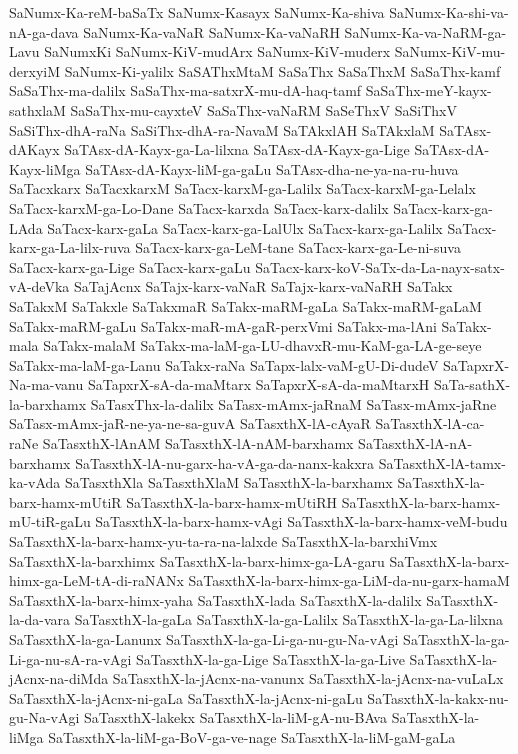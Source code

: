 {SaNumx-Ka-reM-baSaTx
SaNumx-Kasayx
SaNumx-Ka-shiva
SaNumx-Ka-shi-va-nA-ga-dava
SaNumx-Ka-vaNaR
SaNumx-Ka-vaNaRH
SaNumx-Ka-va-NaRM-ga-Lavu
SaNumxKi
SaNumx-KiV-mudArx
SaNumx-KiV-muderx
SaNumx-KiV-mu-derxyiM
SaNumx-Ki-yalilx
SaSAThxMtaM
SaSaThx
SaSaThxM
SaSaThx-kamf
SaSaThx-ma-dalilx
SaSaThx-ma-satxrX-mu-dA-haq-tamf
SaSaThx-meY-kayx-sathxlaM
SaSaThx-mu-cayxteV
SaSaThx-vaNaRM
SaSeThxV
SaSiThxV
SaSiThx-dhA-raNa
SaSiThx-dhA-ra-NavaM
SaTAkxlAH
SaTAkxlaM
SaTAsx-dAKayx
SaTAsx-dA-Kayx-ga-La-lilxna
SaTAsx-dA-Kayx-ga-Lige
SaTAsx-dA-Kayx-liMga
SaTAsx-dA-Kayx-liM-ga-gaLu
SaTAsx-dha-ne-ya-na-ru-huva
SaTacxkarx
SaTacxkarxM
SaTacx-karxM-ga-Lalilx
SaTacx-karxM-ga-Lelalx
SaTacx-karxM-ga-Lo-Dane
SaTacx-karxda
SaTacx-karx-dalilx
SaTacx-karx-ga-LAda
SaTacx-karx-gaLa
SaTacx-karx-ga-LalUlx
SaTacx-karx-ga-Lalilx
SaTacx-karx-ga-La-lilx-ruva
SaTacx-karx-ga-LeM-tane
SaTacx-karx-ga-Le-ni-suva
SaTacx-karx-ga-Lige
SaTacx-karx-gaLu
SaTacx-karx-koV-SaTx-da-La-nayx-satx-vA-deVka
SaTajAcnx
SaTajx-karx-vaNaR
SaTajx-karx-vaNaRH
SaTakx
SaTakxM
SaTakxle
SaTakxmaR
SaTakx-maRM-gaLa
SaTakx-maRM-gaLaM
SaTakx-maRM-gaLu
SaTakx-maR-mA-gaR-perxVmi
SaTakx-ma-lAni
SaTakx-mala
SaTakx-malaM
SaTakx-ma-laM-ga-LU-dhavxR-mu-KaM-ga-LA-ge-seye
SaTakx-ma-laM-ga-Lanu
SaTakx-raNa
SaTapx-lalx-vaM-gU-Di-dudeV
SaTapxrX-Na-ma-vanu
SaTapxrX-sA-da-maMtarx
SaTapxrX-sA-da-maMtarxH
SaTa-sathX-la-barxhamx
SaTasxThx-la-dalilx
SaTasx-mAmx-jaRnaM
SaTasx-mAmx-jaRne
SaTasx-mAmx-jaR-ne-ya-ne-sa-guvA
SaTasxthX-lA-cAyaR
SaTasxthX-lA-ca-raNe
SaTasxthX-lAnAM
SaTasxthX-lA-nAM-barxhamx
SaTasxthX-lA-nA-barxhamx
SaTasxthX-lA-nu-garx-ha-vA-ga-da-nanx-kakxra
SaTasxthX-lA-tamx-ka-vAda
SaTasxthXla
SaTasxthXlaM
SaTasxthX-la-barxhamx
SaTasxthX-la-barx-hamx-mUtiR
SaTasxthX-la-barx-hamx-mUtiRH
SaTasxthX-la-barx-hamx-mU-tiR-gaLu
SaTasxthX-la-barx-hamx-vAgi
SaTasxthX-la-barx-hamx-veM-budu
SaTasxthX-la-barx-hamx-yu-ta-ra-na-lalxde
SaTasxthX-la-barxhiVmx
SaTasxthX-la-barxhimx
SaTasxthX-la-barx-himx-ga-LA-garu
SaTasxthX-la-barx-himx-ga-LeM-tA-di-raNANx
SaTasxthX-la-barx-himx-ga-LiM-da-nu-garx-hamaM
SaTasxthX-la-barx-himx-yaha
SaTasxthX-lada
SaTasxthX-la-dalilx
SaTasxthX-la-da-vara
SaTasxthX-la-gaLa
SaTasxthX-la-ga-Lalilx
SaTasxthX-la-ga-La-lilxna
SaTasxthX-la-ga-Lanunx
SaTasxthX-la-ga-Li-ga-nu-gu-Na-vAgi
SaTasxthX-la-ga-Li-ga-nu-sA-ra-vAgi
SaTasxthX-la-ga-Lige
SaTasxthX-la-ga-Live
SaTasxthX-la-jAcnx-na-diMda
SaTasxthX-la-jAcnx-na-vanunx
SaTasxthX-la-jAcnx-na-vuLaLx
SaTasxthX-la-jAcnx-ni-gaLa
SaTasxthX-la-jAcnx-ni-gaLu
SaTasxthX-la-kakx-nu-gu-Na-vAgi
SaTasxthX-lakekx
SaTasxthX-la-liM-gA-nu-BAva
SaTasxthX-la-liMga
SaTasxthX-la-liM-ga-BoV-ga-ve-nage
SaTasxthX-la-liM-gaM-gaLa
}
